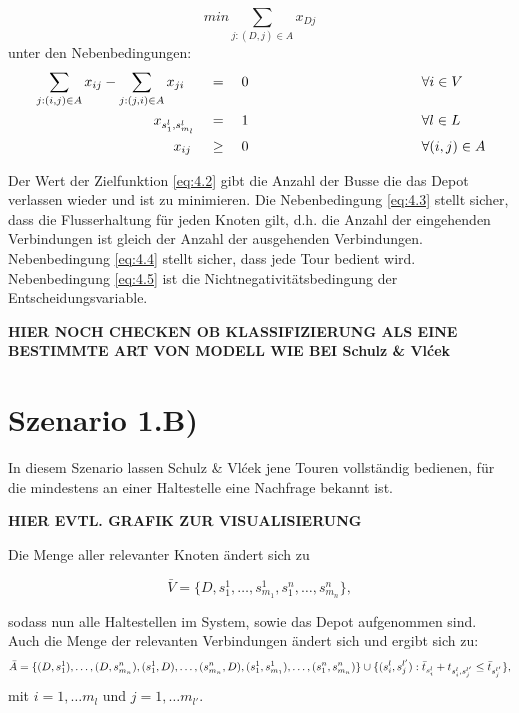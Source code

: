 \begin{equation}
    \label{eq:4.2}
    min \sum_{j:(D,j) \in A} x_{Dj}
\end{equation}
unter den Nebenbedingungen:
\begin{alignat}{3}
    &\sum_{j:(i,j) \in A} x_{ij} - \sum_{j:(j,i) \in A} x_{ji} &&= \quad 0 \hspace{4cm} &&\forall i \in V \label{eq:4.3}\\
    &\hspace{3cm} x_{s_1^l, s_{m_l}^l} &&= \quad 1\hspace{4cm} &&\forall l \in L\label{eq:4.4}\\
    &\hspace{3.5cm} x_{ij} &&\geq \quad 0 \hspace{4cm}&&\forall (i,j) \in A\label{eq:4.5}
\end{alignat}

Der Wert der Zielfunktion \ref{eq:4.2} gibt die Anzahl der Busse die das Depot verlassen wieder und ist zu minimieren. Die Nebenbedingung \ref{eq:4.3} stellt sicher, dass die Flusserhaltung für jeden Knoten gilt, d.h. die Anzahl der eingehenden Verbindungen ist gleich der Anzahl der ausgehenden Verbindungen. Nebenbedingung \ref{eq:4.4} stellt sicher, dass jede Tour bedient wird. Nebenbedingung \ref{eq:4.5} ist die Nichtnegativitätsbedingung der Entscheidungsvariable.

\textbf{HIER NOCH CHECKEN OB KLASSIFIZIERUNG ALS EINE BESTIMMTE ART VON MODELL WIE BEI Schulz \& Vlćek}

\section{Szenario 1.B)}
\label{sec:4.3}
In diesem Szenario lassen Schulz \& Vlćek jene Touren vollständig bedienen, für die mindestens an einer Haltestelle eine Nachfrage bekannt ist. 

\textbf{HIER EVTL. GRAFIK ZUR VISUALISIERUNG}

Die Menge aller relevanter Knoten ändert sich zu

\[
\bar{V} = \{ D, s^1_1, \dots, s^1_{m_1}, s^n_1, \dots, s^n_{m_n} \},
\]

sodass nun alle Haltestellen im System, sowie das Depot aufgenommen sind. Auch die Menge der relevanten Verbindungen ändert sich und ergibt sich zu:
\[
\bar{A}= \{(D, s_1^1), \ldots, (D, s^n_{m_n}), (s_1^1, D), \ldots, (s_{m_n}^n, D), (s_1^1, s_{m_1}^1), \ldots, (s_1^n, s_{m_n}^n)\}   \\   
\cup \{(s_i^l, s_j^{l'}) : \bar{t}_{s_i^l} + t_{s_i^l, s_j^{l'}} \leq \bar{t}_{s_j^{l'}}\},
\]
mit \(i = {1, \dots m_l}\) und \(j = {1, \dots m_{l'}}\).

